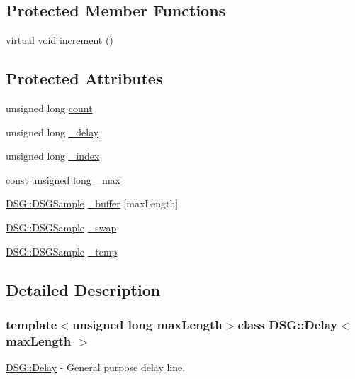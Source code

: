 \subsection*{Protected Member Functions}
\begin{DoxyCompactItemize}
\item 
virtual void \hyperlink{class_d_s_g_1_1_delay_a4c800f6ce87a75d964aab53617d12664}{increment} ()
\end{DoxyCompactItemize}
\subsection*{Protected Attributes}
\begin{DoxyCompactItemize}
\item 
unsigned long \hyperlink{class_d_s_g_1_1_delay_a1d54836950db9724434880d859d1e3ea}{count}
\item 
unsigned long \hyperlink{class_d_s_g_1_1_delay_aad8790118689ae46c7f434b790358e3f}{\+\_\+delay}
\item 
unsigned long \hyperlink{class_d_s_g_1_1_delay_ac39e72226786a3c43b231b69752431ec}{\+\_\+index}
\item 
const unsigned long \hyperlink{class_d_s_g_1_1_delay_a1751998677ff85f6580c383e17347d9c}{\+\_\+max}
\item 
\hyperlink{namespace_d_s_g_ac39a94cd27ebcd9c1e7502d0c624894a}{D\+S\+G\+::\+D\+S\+G\+Sample} \hyperlink{class_d_s_g_1_1_delay_a8c86e03e9656476371f98d049ae1c5c9}{\+\_\+buffer} \mbox{[}max\+Length\mbox{]}
\item 
\hyperlink{namespace_d_s_g_ac39a94cd27ebcd9c1e7502d0c624894a}{D\+S\+G\+::\+D\+S\+G\+Sample} \hyperlink{class_d_s_g_1_1_delay_af026ee90120c5cea6a935aef6cab6624}{\+\_\+swap}
\item 
\hyperlink{namespace_d_s_g_ac39a94cd27ebcd9c1e7502d0c624894a}{D\+S\+G\+::\+D\+S\+G\+Sample} \hyperlink{class_d_s_g_1_1_delay_a039bb7a3a39aff5841b9e808cacc1a6e}{\+\_\+temp}
\end{DoxyCompactItemize}


\subsection{Detailed Description}
\subsubsection*{template$<$unsigned long max\+Length$>$class D\+S\+G\+::\+Delay$<$ max\+Length $>$}

\hyperlink{class_d_s_g_1_1_delay}{D\+S\+G\+::\+Delay} -\/ General purpose delay line. 

